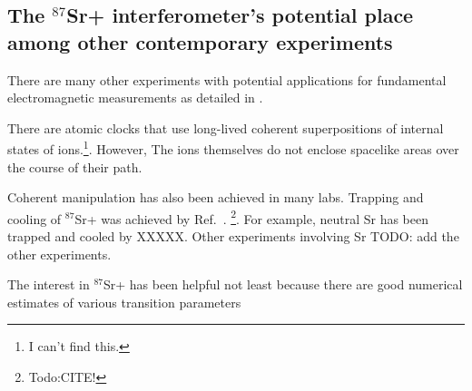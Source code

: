 \subsection{The $^{87}$Sr+ interferometer's potential place among other contemporary experiments}

There are many other experiments with potential applications for fundamental electromagnetic measurements as detailed in \cite{PhotonMassSurvey}. 

There are atomic clocks that use long-lived coherent superpositions of internal states of ions.\footnote{I can't find this. }. However, The ions themselves do not enclose spacelike areas over the course of their path.

Coherent manipulation has also been achieved in many labs. Trapping and cooling of $^{87}$Sr+ was achieved by Ref.~\cite{kurosu_trap_sr}. \footnote{Todo:CITE!}. For example, neutral Sr has been trapped and cooled by XXXXX. 
Other experiments involving Sr TODO: add the other experiments.

The interest in $^{87}$Sr+ has been helpful not least because there are good numerical estimates of various transition parameters \cite{safronovaTheory}


